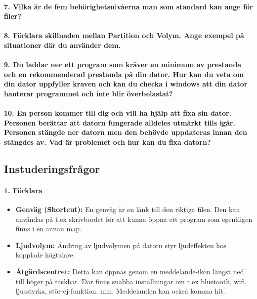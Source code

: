 \paragraph{7. Vilka är de fem behörighetsnivåerna man som standard kan ange för filer?}

\paragraph{8. Förklara skillnaden mellan Partition och Volym. Ange exempel på situationer där du använder dem.}

\paragraph{9. Du laddar ner ett program som kräver en minimum av prestanda och en rekommenderad prestanda på din dator. Hur kan du veta om din dator uppfyller kraven och kan du checka i windows att din dator hanterar programmet och inte blir överbelastat?}

\paragraph{10. En person kommer till dig och vill ha hjälp att fixa sin dator. Personen berättar att datorn fungerade alldeles utmärkt tills igår. Personen stängde ner datorn men den behövde uppdateras innan den stängdes av. Vad är problemet och hur kan du fixa datorn?}

\newpage
\subsection{Instuderingsfrågor}

\paragraph{1. Förklara}
\begin{itemize}
	\item \textbf{Genväg (Shortcut):} En genväg är en länk till den riktiga filen. Den kan användas på t.ex skrivbordet för att kunna öppna ett program som egentligen finns i en annan map.
	\item \textbf{Ljudvolym:} Ändring av ljudvolymen på datorn styr ljudeffekten hos kopplade högtalare.
	\item \textbf{Åtgärdscentret:} Detta kan öppnas genom en meddelande-ikon längst ned till höger på taskbar. Där finns snabba inställningar om t.ex bluetooth, wifi, ljusstyrka, stör-ej-funktion, mm. Meddelanden kan också komma hit.
\end{itemize} 

